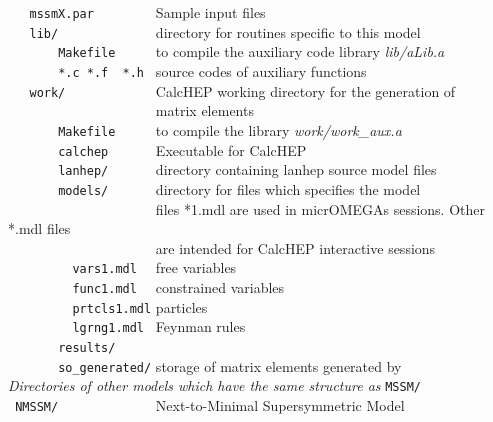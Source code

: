 \documentclass[12pt,a4paper]{article}
\begin{document}
\verb|   mssmX.par        | Sample input files \\
\verb|   lib/             |      directory for routines specific to this model   \\
\verb|       Makefile     |   to compile the auxiliary code library {\it lib/aLib.a}    \\
\verb|       *.c *.f  *.h |      source codes of auxiliary functions             \\
\verb|   work/            |              CalcHEP working directory for the generation of   \\
\verb|                    |             matrix elements                                    \\
\verb|       Makefile     |  to compile the library {\it work/work\_aux.a}           \\ 
\verb|       calchep      | Executable for CalcHEP\\
\verb|       lanhep/      |          directory containing lanhep source model files   \\
\verb|       models/      |  directory for files  which specifies the model\\
\verb|                    | files *1.mdl are used in micrOMEGAs sessions. Other *.mdl files\\
\verb|                    | are intended for CalcHEP interactive sessions\\
\verb|         vars1.mdl  |  free  variables   \\
\verb|         func1.mdl  |  constrained variables   \\
\verb|         prtcls1.mdl|  particles  \\
\verb|         lgrng1.mdl |  Feynman rules\\
\verb|       results/  |                                                  \\
\verb|       so_generated/|   storage  of  matrix elements generated by \calchep \\
{\it Directories of other models which have the same structure as} {\tt  MSSM/ }\\
\verb| NMSSM/             |         Next-to-Minimal Supersymmetric Model\cite{Ellwanger:2006rn,Belanger:2005kh} \\
\end{document}
